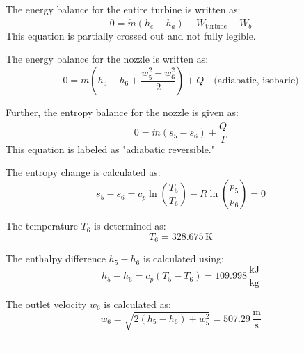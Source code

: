 The energy balance for the entire turbine is written as:  
\[
0 = \dot{m} (h_e - h_a) - \dot{W}_{\text{turbine}} - \dot{W}_b
\]  
This equation is partially crossed out and not fully legible.  

The energy balance for the nozzle is written as:  
\[
0 = \dot{m} (h_5 - h_6 + \frac{w_5^2 - w_6^2}{2}) + \dot{Q} \quad \text{(adiabatic, isobaric)}
\]  

Further, the entropy balance for the nozzle is given as:  
\[
0 = \dot{m} (s_5 - s_6) + \frac{\dot{Q}}{T}
\]  
This equation is labeled as "adiabatic reversible."  

The entropy change is calculated as:  
\[
s_5 - s_6 = c_p \ln \left( \frac{T_5}{T_6} \right) - R \ln \left( \frac{p_5}{p_6} \right) = 0
\]  

The temperature \( T_6 \) is determined as:  
\[
T_6 = 328.675 \, \text{K}
\]  

The enthalpy difference \( h_5 - h_6 \) is calculated using:  
\[
h_5 - h_6 = c_p (T_5 - T_6) = 109.998 \, \frac{\text{kJ}}{\text{kg}}
\]  

The outlet velocity \( w_6 \) is calculated as:  
\[
w_6 = \sqrt{2 (h_5 - h_6) + w_5^2} = 507.29 \, \frac{\text{m}}{\text{s}}
\]  

---